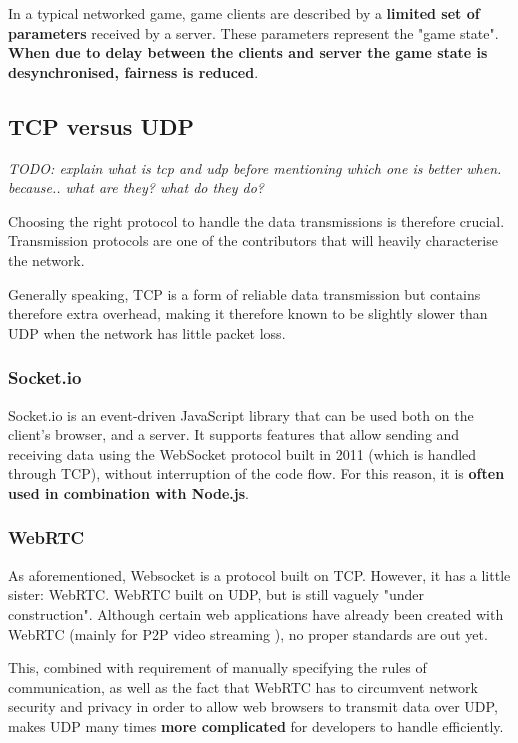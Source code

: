 \documentclass[bsc,frontabs,twoside,singlespacing,parskip,deptreport]{infthesis}     %
\begin{document}
In a typical networked game, game clients are described by a \textbf{limited set of parameters} received by a server. These parameters represent the "game state". \textbf{When due to delay between the clients and server the game state is desynchronised, fairness is reduced}\cite{Fairness_and_Playability}.

\subsection{TCP versus UDP}
\textit{TODO: explain what is tcp and udp before mentioning which one is better when. because.. what are they? what do they do?}

Choosing the right protocol to handle the data transmissions is therefore crucial. Transmission protocols are one of the contributors that will heavily characterise the network.
 
Generally speaking, TCP is a form of reliable data transmission but contains therefore extra overhead, making it therefore known to be slightly slower than UDP when the network has little packet loss.

\subsubsection{Socket.io}
Socket.io is an event-driven JavaScript library that can be used both on the client's browser, and a server\cite{Socketio}. It supports features that allow sending and receiving data using the WebSocket protocol built in 2011 (which is handled through TCP), without interruption of the code flow\cite{Socketio_Benchmark}\cite{Socketio_TCP_Benchmark}. For this reason, it is \textbf{often used in combination with Node.js}.

\subsubsection{WebRTC}
As aforementioned, Websocket is a protocol built on TCP. However, it has a little sister: WebRTC. WebRTC built on UDP, but is still vaguely "under construction"\cite{Browser_Networking}. Although certain web applications have already been created with WebRTC (mainly for P2P video streaming \cite{P2P_Video_Streaming_HTML5_WebRTC}), no proper standards are out yet\cite{Web_Apps_Superior}.

This, combined with requirement of manually specifying the rules of communication, as well as the fact that WebRTC has to circumvent network security and privacy in order to allow web browsers to transmit data over UDP\cite{P2P_Video_Streaming_HTML5_WebRTC}, makes UDP many times \textbf{more complicated} for developers to handle efficiently.
\end{document}
